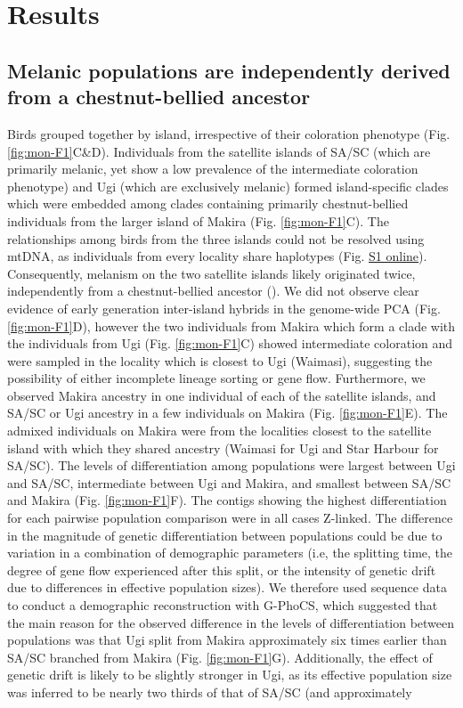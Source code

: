 \section{Results}

\subsection{Melanic populations are independently derived from a chestnut-bellied ancestor}
Birds grouped together by island, irrespective of their coloration phenotype (Fig. \ref{fig:mon-F1}C\&D). Individuals from the satellite islands of \ac{SA/SC} (which are primarily melanic, yet show a low prevalence of the intermediate coloration phenotype) and Ugi (which are exclusively melanic) formed island-specific clades which were embedded among clades containing primarily chestnut-bellied individuals from the larger island of Makira (Fig. \ref{fig:mon-F1}C). The relationships among birds from the three islands could not be resolved using mtDNA, as individuals from every locality share haplotypes (Fig. \href{https://journals.plos.org/PLOSGENETICS/article?id=10.1371/journal.pgen.1010474#sec017}{S1 online}). Consequently, melanism on the two satellite islands likely originated twice, independently from a chestnut-bellied ancestor (\cite{uy2016mutations,cooper2017genomic}). We did not observe clear evidence of early generation inter-island hybrids in the genome-wide \acs{PCA} (Fig. \ref{fig:mon-F1}D), however the two individuals from Makira which form a clade with the individuals from Ugi (Fig. \ref{fig:mon-F1}C) showed intermediate coloration and were sampled in the locality which is closest to Ugi (Waimasi), suggesting the possibility of either incomplete lineage sorting or gene flow. Furthermore, we observed Makira ancestry in one individual of each of the satellite islands, and \ac{SA/SC} or Ugi ancestry in a few individuals on Makira (Fig. \ref{fig:mon-F1}E). The admixed individuals on Makira were from the localities closest to the satellite island with which they shared ancestry (Waimasi for Ugi and Star Harbour for \ac{SA/SC}). The levels of differentiation among populations were largest between Ugi and \ac{SA/SC}, intermediate between Ugi and Makira, and smallest between \ac{SA/SC} and Makira (Fig. \ref{fig:mon-F1}F). The contigs showing the highest differentiation for each pairwise population comparison were in all cases Z-linked. The difference in the magnitude of genetic differentiation between populations could be due to variation in a combination of demographic parameters (i.e, the splitting time, the degree of gene flow experienced after this split, or the intensity of genetic drift due to differences in effective population sizes). We therefore used sequence data to conduct a demographic reconstruction with G-PhoCS, which suggested that the main reason for the observed difference in the levels of differentiation between populations was that Ugi split from Makira approximately six times earlier than \ac{SA/SC} branched from Makira (Fig. \ref{fig:mon-F1}G). Additionally, the effect of genetic drift is likely to be slightly stronger in Ugi, as its effective population size was inferred to be nearly two thirds of that of \ac{SA/SC} (and approximately 
